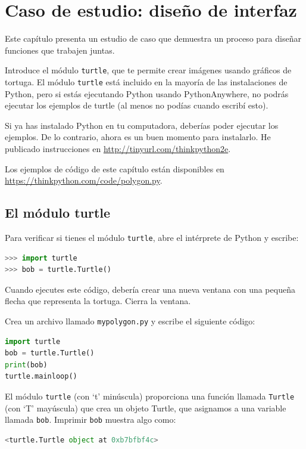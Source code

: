 
\chapter{Caso de estudio: diseño de interfaz}

Este capítulo presenta un estudio de caso que demuestra un proceso para diseñar funciones que trabajen juntas.

Introduce el módulo \texttt{turtle}, que te permite crear imágenes usando gráficos de tortuga. El módulo \texttt{turtle} está incluido en la mayoría de las instalaciones de Python, pero si estás ejecutando Python usando PythonAnywhere, no podrás ejecutar los ejemplos de turtle (al menos no podías cuando escribí esto).

Si ya has instalado Python en tu computadora, deberías poder ejecutar los ejemplos. De lo contrario, ahora es un buen momento para instalarlo. He publicado instrucciones en \url{http://tinyurl.com/thinkpython2e}.

Los ejemplos de código de este capítulo están disponibles en \url{https://thinkpython.com/code/polygon.py}.

\section{El módulo turtle}

Para verificar si tienes el módulo \texttt{turtle}, abre el intérprete de Python y escribe:

\begin{lstlisting}[language=Python]
>>> import turtle
>>> bob = turtle.Turtle()
\end{lstlisting}

Cuando ejecutes este código, debería crear una nueva ventana con una pequeña flecha que representa la tortuga. Cierra la ventana.

Crea un archivo llamado \texttt{mypolygon.py} y escribe el siguiente código:

\begin{lstlisting}[language=Python]
import turtle
bob = turtle.Turtle()
print(bob)
turtle.mainloop()
\end{lstlisting}

El módulo \texttt{turtle} (con `t' minúscula) proporciona una función llamada \texttt{Turtle} (con `T' mayúscula) que crea un objeto Turtle, que asignamos a una variable llamada \texttt{bob}. Imprimir \texttt{bob} muestra algo como:

\begin{lstlisting}[language=Python]
<turtle.Turtle object at 0xb7bfbf4c>
\end{lstlisting}

